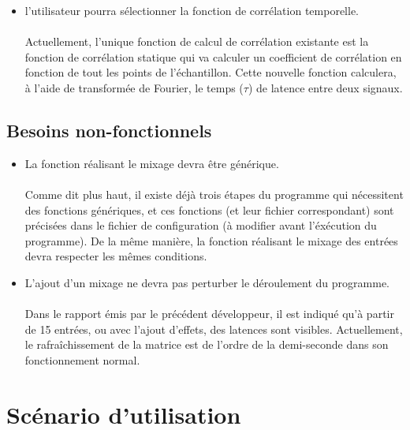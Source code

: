 \documentclass{article}
\begin{document}
\begin{itemize}
 \item l'utilisateur pourra sélectionner la fonction de corrélation temporelle.
       \paragraph{}
       Actuellement, l'unique fonction de calcul de corrélation existante est
       la fonction de corrélation statique qui va calculer un coefficient de corrélation
       en fonction de tout les points de l’échantillon. Cette nouvelle fonction
       calculera, à l'aide de transformée de Fourier, le temps ($\tau$) de latence
       entre deux signaux.
       
       
\end{itemize}
\subsection{Besoins non-fonctionnels}
\begin{itemize}
 \item La fonction réalisant le mixage devra être générique.
       \paragraph{}
       Comme dit plus haut, il existe déjà trois étapes du programme qui
       nécessitent des fonctions génériques, et ces fonctions (et leur fichier
       correspondant) sont précisées dans le fichier de configuration (à
       modifier avant l'éxécution du programme). De la même manière, la
       fonction réalisant le mixage des entrées devra respecter les mêmes
       conditions.
 \item L'ajout d'un mixage ne devra pas perturber le déroulement du programme.
       \paragraph{}
       Dans le rapport émis par le précédent développeur, il est indiqué qu'à
       partir de 15 entrées, ou avec l'ajout d'effets, des latences sont
       visibles. Actuellement, le rafraîchissement de la matrice est de l'ordre
       de la demi-seconde dans son fonctionnement normal.
\end{itemize}
\section{Scénario d'utilisation}
\end{document}
